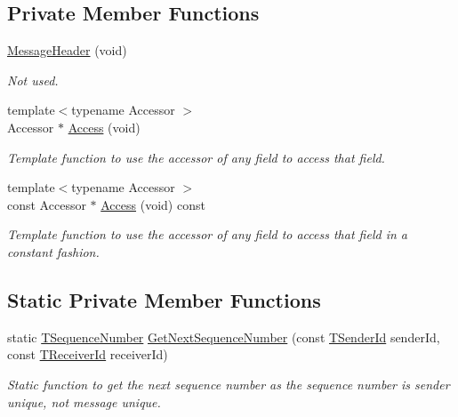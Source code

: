 \subsection*{Private Member Functions}
\begin{DoxyCompactItemize}
\item 
\hyperlink{class_terra_swarm_1_1_message_header_a3a3365d5965976b4ff944e90bcc57d10}{Message\-Header} (void)
\begin{DoxyCompactList}\small\item\em Not used. \end{DoxyCompactList}\item 
{\footnotesize template$<$typename Accessor $>$ }\\Accessor $\ast$ \hyperlink{class_terra_swarm_1_1_message_header_adf08e6517af2015ca25f0cadeaf90126}{Access} (void)
\begin{DoxyCompactList}\small\item\em Template function to use the accessor of any field to access that field. \end{DoxyCompactList}\item 
{\footnotesize template$<$typename Accessor $>$ }\\const Accessor $\ast$ \hyperlink{class_terra_swarm_1_1_message_header_aaa0d3fbe9cd0e0c63384810e57c246f1}{Access} (void) const 
\begin{DoxyCompactList}\small\item\em Template function to use the accessor of any field to access that field in a constant fashion. \end{DoxyCompactList}\end{DoxyCompactItemize}
\subsection*{Static Private Member Functions}
\begin{DoxyCompactItemize}
\item 
static \hyperlink{class_terra_swarm_1_1_message_header_a0d92af0bc15cc856a21975d1f3813eb5}{T\-Sequence\-Number} \hyperlink{class_terra_swarm_1_1_message_header_a963b8a46a389a741f86471dbd722cae2}{Get\-Next\-Sequence\-Number} (const \hyperlink{class_terra_swarm_1_1_message_header_a516b36855e2aad7cfbf8770f1b42784f}{T\-Sender\-Id} sender\-Id, const \hyperlink{class_terra_swarm_1_1_message_header_aa3260702b182b6f88ddbdd3416e98df0}{T\-Receiver\-Id} receiver\-Id)
\begin{DoxyCompactList}\small\item\em Static function to get the next sequence number as the sequence number is sender unique, not message unique. \end{DoxyCompactList}\end{DoxyCompactItemize}


